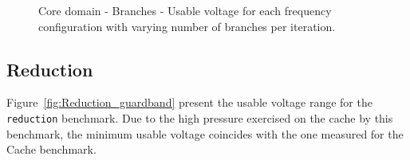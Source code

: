 \begin{figure}[!htb]
    \centering
    \begin{subfigmatrix}{2}
      \label{fig:Branches_guardband}
    \end{subfigmatrix}
    \caption{Core domain - Branches - Usable voltage for each frequency configuration with varying number of branches per iteration.}
\end{figure}

\subsection{Reduction}

Figure~\ref{fig:Reduction_guardband} present the usable voltage range for the \texttt{reduction} benchmark. Due to the high pressure exercised on the cache by this benchmark, the minimum usable voltage coincides with the one measured for the Cache benchmark.


